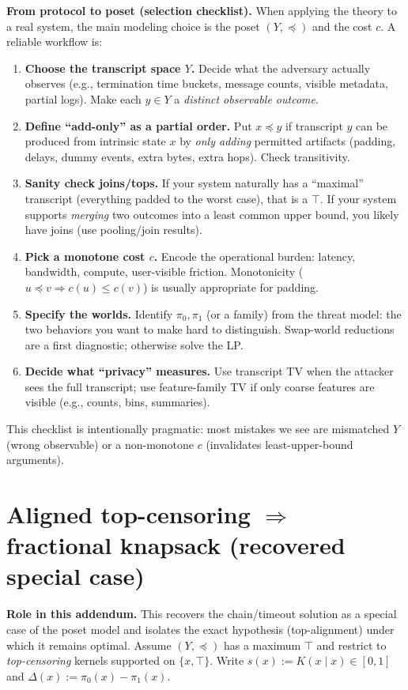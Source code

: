 \documentclass[11pt]{article}
\theoremstyle{definition}
\theoremstyle{remark}
\begin{document}
\vspace{0.25em}\noindent
\textbf{From protocol to poset (selection checklist).}
When applying the theory to a real system, the main modeling choice is the poset $(Y,\preceq)$ and the cost $c$.
A reliable workflow is:
\begin{enumerate}[leftmargin=*]
\item \textbf{Choose the transcript space $Y$.} Decide what the adversary actually observes (e.g., termination time buckets, message counts, visible metadata, partial logs). Make each $y\in Y$ a \emph{distinct observable outcome}.
\item \textbf{Define ``add-only'' as a partial order.} Put $x\preceq y$ if transcript $y$ can be produced from intrinsic state $x$ by \emph{only adding} permitted artifacts (padding, delays, dummy events, extra bytes, extra hops). Check transitivity.
\item \textbf{Sanity check joins/tops.} If your system naturally has a ``maximal'' transcript (everything padded to the worst case), that is a $\top$. If your system supports \emph{merging} two outcomes into a least common upper bound, you likely have joins (use pooling/join results).
\item \textbf{Pick a monotone cost $c$.} Encode the operational burden: latency, bandwidth, compute, user-visible friction. Monotonicity ($u\preceq v\Rightarrow c(u)\le c(v)$) is usually appropriate for padding.
\item \textbf{Specify the worlds.} Identify $\pi_0,\pi_1$ (or a family) from the threat model: the two behaviors you want to make hard to distinguish. Swap-world reductions are a first diagnostic; otherwise solve the LP.
\item \textbf{Decide what ``privacy'' measures.} Use transcript TV when the attacker sees the full transcript; use feature-family TV if only coarse features are visible (e.g., counts, bins, summaries).
\end{enumerate}
\noindent
This checklist is intentionally pragmatic: most mistakes we see are mismatched $Y$ (wrong observable) or a non-monotone $c$ (invalidates least-upper-bound arguments).


\section[Aligned top-censoring to fractional knapsack]{Aligned top-censoring $\Rightarrow$ fractional knapsack (recovered special case)}
\noindent\textbf{Role in this addendum.} This recovers the chain/timeout solution as a special case of the poset model and isolates the exact hypothesis (top-alignment) under which it remains optimal.
Assume $(Y,\preceq)$ has a maximum $\top$ and restrict to \emph{top-censoring} kernels supported on $\{x,\top\}$.
Write $s(x):=K(x\mid x)\in[0,1]$ and $\Delta(x):=\pi_0(x)-\pi_1(x)$.
\end{document}
